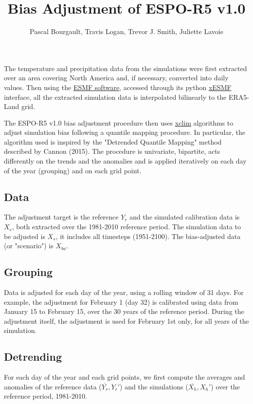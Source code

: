 \documentclass[letterpaper,10pt]{article}
\begin{document}
\title{Bias Adjustment of ESPO-R5 v1.0}
\author{Pascal Bourgault, Travis Logan, Trevor J. Smith, Juliette Lavoie}
\maketitle

The temperature and precipitation data from the simulations were first extracted over an area covering North America and, if necessary, converted into daily values.
Then using the \href{https://earthsystemmodeling.org/regrid/}{ESMF software}, accessed through its python \href{https://xesmf.readthedocs.io/en/latest/}{xESMF} interface, all the extracted simulation data is interpolated 
bilinearly to the ERA5-Land grid.

The ESPO-R5 v1.0 bias adjustment procedure then uses \href{https://xclim.readthedocs.io/en/stable/sdba.html}{xclim} algorithms to adjust simulation bias following a quantile mapping procedure.
In particular, the algorithm used is inspired by the "Detrended Quantile Mapping" method described by Cannon (2015).
The procedure is univariate, bipartite, acts differently on the trends and the anomalies and is applied iteratively on each day of the year (grouping) and on each grid point.

\subsection{Data}
The adjustment target is the reference $Y_r$ and the simulated calibration data is $X_c$, both extracted over the 1981-2010 reference period.
The simulation data to be adjusted is $X_s$, it includes all timesteps (1951-2100).
The bias-adjusted data (or "scenario") is $X_{ba}$.

\subsection{Grouping}
Data is adjusted for each day of the year, using a rolling window of 31 days.
For example, the adjustment for February 1 (day 32) is calibrated using data from January 15 to February 15, over the 30 years of the reference period. 
During the adjustment itself, the adjustment is used for February 1st only, for all years of the simulation. 

\subsection{Detrending}
For each day of the year and each grid points, we first compute the averages and anomalies of the reference data ($\overline{Y_r}, Y_r'$) and the simulations ($\overline{X_h}, X_h'$) over the reference period, 1981-2010.
\end{document}
